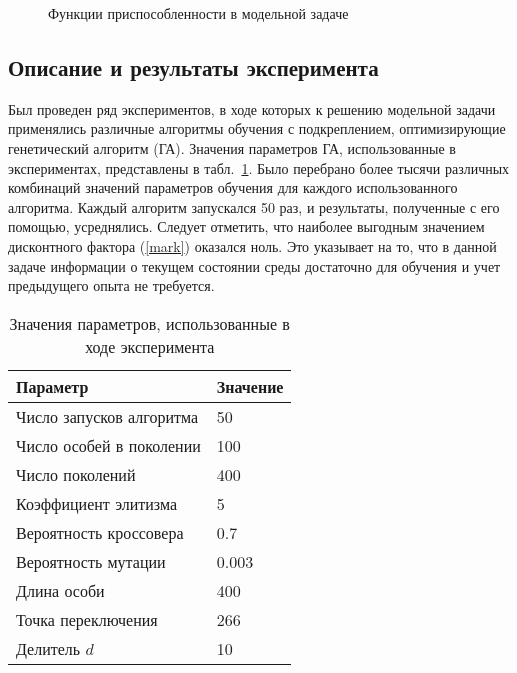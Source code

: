 	\begin{figure}[h!]
		\center{\texttt{[image: h1h2g]}}
		\caption{Функции приспособленности в модельной задаче}
		\label{pict:h1h2g}
	\end{figure}
		
	\subsection{Описание и результаты эксперимента}
	Был проведен ряд экспериментов, в ходе которых к решению модельной задачи применялись различные алгоритмы обучения с подкреплением, оптимизирующие генетический алгоритм (ГА). 
    Значения параметров ГА, использованные в экспериментах, представлены в табл.~\ref{experiment}. Было перебрано более тысячи различных комбинаций значений параметров обучения
    для каждого использованного алгоритма. Каждый алгоритм запускался 50 раз, и результаты, полученные с его помощью, усреднялись. Следует отметить, что наиболее выгодным значением дисконтного фактора (\ref{mark}) оказался ноль. Это указывает на то, что в данной задаче 
    информации о текущем состоянии среды достаточно для обучения и учет предыдущего опыта не требуется. 	
	
	\begin{table}[h!]
	\caption{Значения параметров, использованные в ходе эксперимента}
    \label{experiment}
	\begin{tabular}{|l|l|} \hline
	Параметр & Значение \\ \hline
	Число запусков алгоритма & 50 \\ \hline
	Число особей в поколении & 100 \\ \hline
	Число поколений & 400 \\ \hline
	Коэффициент элитизма & 5 \\ \hline
	Вероятность кроссовера & 0.7 \\ \hline
	Вероятность мутации & 0.003 \\ \hline
	Длина особи & 400 \\ \hline
	Точка переключения & 266 \\ \hline
	Делитель $d$ & 10 \\ \hline
	\end{tabular}
	\end{table}
	
